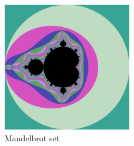\documentclass[11pt]{article}
\begin{document}
    \begin{figure}[htbp]
        \label{fig:figure}
        \centering
        \includegraphics[width=0.5\textwidth]{MandelbrotSet}
        \caption{Mandelbrot set}
    \end{figure}

    
    
\end{document}
